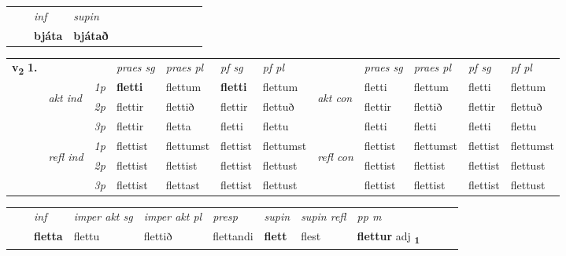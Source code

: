 \begin{tabular}{llllllllllll}
 & & \textit{inf}      & \textit{supin}       \\*
  & & \textbf{bjáta}       &  \textbf{bjátað}   \\*
\cmidrule{1-12}
\end{tabular}



\begin{tabular}{llllllllllll} \toprule
\multirow{4}{*}{{{\textbf{v{\textsubscript{2}}} \Large{\textbf{1.}}}}}  & &   &  \textit{praes sg}  & \textit{praes pl}  &\textit{ pf sg} & \textit{pf pl} &  &  \textit{praes sg}  & \textit{praes pl}  & \textit{pf sg} & \textit{pf pl } \\*
	\cmidrule{4-7} \cmidrule{9-12}
 & \multirow{3}{*}{\begin{turn}{90}\textit{akt ind}\end{turn}} & {\textit{1p}} & \textbf{fletti} & flettum    & \textbf{fletti} & flettum & \multirow{3}{*}{\begin{turn}{90}\textit{akt con}\end{turn}} &fletti & flettum & fletti & flettum\\*
& &  {\textit{2p}} &  flettir  & flettið   & flettir & flettuð & & flettir & flettið & flettir & flettuð \\*
& &  {\textit{3p}} & flettir & fletta   & fletti & flettu & & fletti & fletti& fletti & flettu  \\*
\cmidrule{4-7} \cmidrule{9-12}
 &\multirow{3}{*}{\begin{turn}{90}\textit{refl ind}\end{turn}} & {\textit{1p}} & flettist & flettumst    & flettist & flettumst & \multirow{3}{*}{\begin{turn}{90}\textit{refl con}\end{turn}}  &flettist & flettumst & flettist & flettumst\\*
 &&  {\textit{2p}} &  flettist  & flettist   & flettist & flettust & &flettist & flettist & flettist & flettust \\*
& &  {\textit{3p}} & flettist & flettast   & flettist & flettust & & flettist & flettist& flettist & flettust  \\*
\cmidrule{4-7} \cmidrule{9-12}
\end{tabular}


\begin{tabular}{llllllllllll}
 & & \textit{inf} & \textit{imper akt sg} & \textit{imper akt pl}   & \textit{presp} & \textit{supin} & \textit{supin refl} & \textit{pp m}     \\*
  & & \textbf{fletta} & flettu  & flettið   & flettandi &  \textbf{flett} & flest & \textbf{flettur} adj \textbf{\textsubscript{1}} \\*
\cmidrule{1-12}
\end{tabular}



